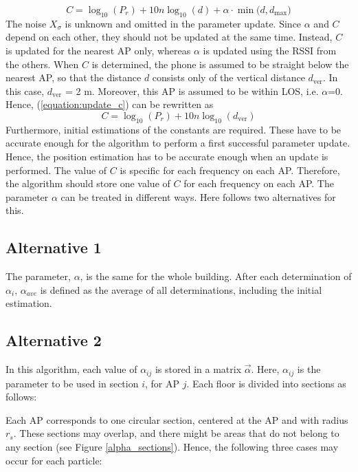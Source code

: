 \documentclass{LTHthesis}
\begin{document}
%
\begin{equation}
C = \log_{10}(P_r)+10n\log_{10}(d)+\alpha\cdot\min({d, d_{\text{max}})}
\label{equation:update_c}
\end{equation}
%
The noise $X_\sigma$ is unknown and omitted in the parameter update. 
%
Since $\alpha$ and $C$ depend on each other, they should not be updated at the same time. Instead, $C$ is updated for the nearest AP only, whereas $\alpha$ is updated using the RSSI from the others. When $C$ is determined, the phone is assumed to be straight below the nearest AP, so that the distance $d$ consists only of the vertical distance $d_{\text{ver}}$. In this case, $d_{\text{ver}}$ = 2 m. Moreover, this AP is assumed to be within LOS, i.e. $\alpha$=0. Hence, (\ref{equation:update_c}) can be rewritten as
%
\begin{equation}
C = \log_{10}(P_r)+10n\log_{10}(d_{\text{ver}})
\label{equation:update_c_simple}
\end{equation}
%
Furthermore, initial estimations of the constants are required. These have to be accurate enough for the algorithm to perform a first successful parameter update. Hence, the position estimation has to be accurate enough when an update is performed. 
%
The value of $C$ is specific for each frequency on each AP. Therefore, the algorithm should store one value of $C$ for each frequency on each AP.
The parameter $\alpha$ can be treated in different ways. Here follows two alternatives for this.

\subsection{Alternative 1}
The parameter, $\alpha$, is the same for the whole building. After each determination of $\alpha_i$, $\alpha_{ave}$ is defined as the average of all determinations, including the initial estimation.


%
\subsection{Alternative 2}
In this algorithm, each value of $\alpha_{ij}$ is stored in a matrix $\vec{\alpha}$. Here, $\alpha_{ij}$ is the parameter to be used in section $i$, for AP $j$. Each floor is divided into sections as follows:

Each AP corresponds to one circular section, centered at the AP and with radius $r_s$. These sections may overlap, and there might be areas that do not belong to any section (see Figure \ref{alpha_sections}). Hence, the following three cases may occur for each particle:
\end{document}

